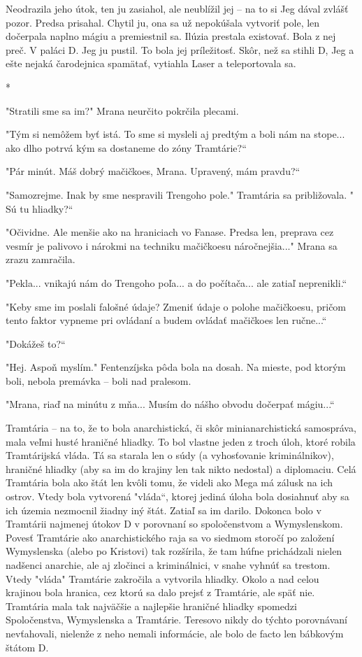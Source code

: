 \documentclass{book}
\begin{document}
Neodrazila jeho útok, ten ju zasiahol, ale neublížil jej – na to si Jeg dával zvlášť pozor. Predsa prisahal. Chytil ju, ona sa už nepokúšala vytvoriť pole, len dočerpala naplno mágiu a premiestnil sa. Ilúzia prestala existovať. Bola z nej preč. V paláci D. Jeg ju pustil. To bola jej príležitosť. Skôr, než sa stihli D, Jeg a ešte nejaká čarodejnica spamätať, vytiahla Laser a teleportovala sa.

\begin{center}

*

\end{center}

"$ $Stratili sme sa im?"$ $ Mrana neurčito pokrčila plecami.

"$ $Tým si nemôžem byť istá. To sme si mysleli aj predtým a boli nám na stope... ako dlho potrvá kým sa dostaneme do zóny Tramtárie?“

"$ $Pár minút. Máš dobrý mačičkoes, Mrana. Upravený, mám pravdu?“

"$ $Samozrejme. Inak by sme nespravili Trengoho pole."$ $ Tramtária sa približovala. "$ $Sú tu hliadky?“

"$ $Očividne. Ale menšie ako na hraniciach vo Fanase. Predsa len, preprava cez vesmír je palivovo i nárokmi na techniku mačičkoesu náročnejšia..."$ $ Mrana sa zrazu zamračila.

"$ $Pekla... vnikajú nám do Trengoho poľa... a do počítača... ale zatiaľ neprenikli.“

"$ $Keby sme im poslali falošné údaje? Zmeniť údaje o polohe mačičkoesu, pričom tento faktor vypneme pri ovládaní a budem ovládať mačičkoes len ručne...“

"$ $Dokážeš to?“

"$ $Hej. Aspoň myslím."$ $ Fentenzíjska pôda bola na dosah. Na mieste, pod ktorým boli, nebola premávka – boli nad pralesom.

"$ $Mrana, riaď na minútu z mňa... Musím do nášho obvodu dočerpať mágiu...“

Tramtária – na to, že to bola anarchistická, či skôr minianarchistická samospráva, mala veľmi husté hraničné hliadky. To bol vlastne jeden z troch úloh, ktoré robila Tramtárijská vláda. Tá sa starala len o súdy (a vyhosťovanie kriminálnikov), hraničné hliadky (aby sa im do krajiny len tak nikto nedostal) a diplomaciu. Celá Tramtária bola ako štát len kvôli tomu, že videli ako Mega má zálusk na ich ostrov. Vtedy bola vytvorená "$ $vláda“, ktorej jediná úloha bola dosiahnuť aby sa ich územia nezmocnil žiadny iný štát. Zatiaľ sa im darilo. Dokonca bolo v Tramtárii najmenej útokov D v porovnaní so spoločenstvom a Wymyslenskom. Povesť Tramtárie ako anarchistického raja sa vo siedmom storočí po založení Wymyslenska (alebo po Kristovi) tak rozšírila, že tam húfne prichádzali nielen nadšenci anarchie, ale aj zločinci a kriminálnici, v snahe vyhnúť sa trestom. Vtedy "$ $vláda"$ $ Tramtárie zakročila a vytvorila hliadky. Okolo a nad celou krajinou bola hranica, cez ktorú sa dalo prejsť z Tramtárie, ale späť nie. Tramtária mala tak najväčšie a najlepšie hraničné hliadky spomedzi Spoločenstva, Wymyslenska a Tramtárie. Teresovo nikdy do týchto porovnávaní nevťahovali, nielenže z neho nemali informácie, ale bolo de facto len bábkovým štátom D.
\end{document}
